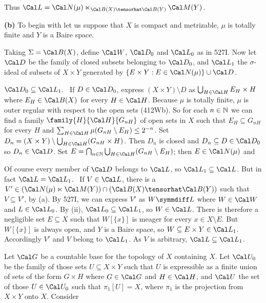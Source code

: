 {Thus $\Cal L=\Cal N(\mu)\ltimes_{\Cal B(X)\tensorhat\Cal B(Y)}\Cal M(Y)$.

\medskip

{\bf (b)} To begin with let us suppose
that $X$ is compact and metrizable, $\mu$ is totally finite and $Y$ is a
Baire space.

\medskip

Taking $\Sigma=\Cal B(X)$, define $\Cal W$, $\Cal D_0$ and $\Cal L_0$ as in 527I.
Now let $\Cal D$ be the family of closed subsets belonging to $\Cal D_0$, and
$\Cal L_1$ the $\sigma$-ideal of subsets of $X\times Y$ generated by
$\{E\times Y:E\in\Cal N(\mu)\}\cup\Cal D$.

\medskip

 $\Cal D_0\subseteq\Cal L_1$.
\Prf\ If $D\in\Cal D_0$, express $(X\times Y)\setminus D$ as
$\bigcup_{H\in\Cal H}E_H\times H$ where $E_H\in\Cal B(X)$ for every $H\in\Cal H$.
Because $\mu$ is totally finite, $\mu$ is outer
regular with respect to the open sets (412Wb).
So for each $n\in\Bbb N$ we can find a family
$\family{H}{\Cal H}{G_{nH}}$ of open sets in $X$ such that $E_H\subseteq G_{nH}$ for
every $H$ and $\sum_{H\in\Cal H}\mu(G_{nH}\setminus E_H)\le 2^{-n}$.   Set
$D_n=(X\times Y)\setminus\bigcup_{H\in\Cal H}(G_{nH}\times H)$.   Then $D_n$ is closed
and $D_n\subseteq D\in\Cal D_0$ so $D_n\in\Cal D$.   Set
$E=\bigcap_{n\in\Bbb N}\bigcup_{H\in\Cal H}(G_{nH}\setminus E_H)$;   then
$E\in\Cal N(\mu)$ and


\medskip

 Of course every member of $\Cal D$ belongs to $\Cal L$, so
$\Cal L_1\subseteq\Cal L$.   But in fact $\Cal L=\Cal L_1$.   \Prf\ If $V\in\Cal L$,
there is a $V'\in(\Cal N(\mu)\ltimes\Cal M(Y))\cap(\Cal B(X)\tensorhat\Cal B(Y))$
such that $V\subseteq V'$, by (a).   By 527I, we can
express $V'$ as $W\symmdiff L$ where $W\in\Cal W$ and $L\in\Cal L_0$.   By (ii),
$\Cal L_0\subseteq\Cal L_1$, so $W\in\Cal L$.   There is therefore a negligible set
$E\subseteq X$ such that $W[\{x\}]$ is meager for every $x\in X\setminus E$.
But $W[\{x\}]$ is always open, and $Y$ is a Baire
space, so $W\subseteq E\times Y\in\Cal L_1$.   Accordingly $V'$ and $V$ belong to
$\Cal L_1$.   As $V$ is arbitrary, $\Cal L\subseteq\Cal L_1$.\ \Qed

\medskip

 Let $\Cal G$ be a countable base for the topology of $X$ containing
$X$.   Let
$\Cal U_0$ be the family of those sets $U\subseteq X\times Y$ such that $U$
is expressible as a finite union of sets of the form $G\times H$ where $G\in\Cal G$
and $H\in\Cal H$, and $\Cal U$ the set of those $U\in\Cal U_0$ such that
$\pi_1[U]=X$, where $\pi_1$ is the projection from $X\times Y$ onto $X$.
Consider

}
